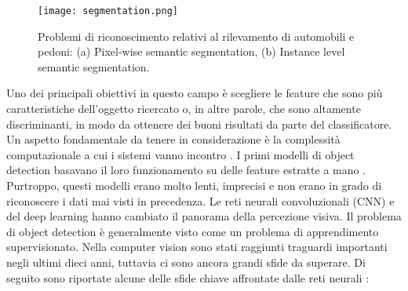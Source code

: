 \begin{figure}
    \centering
    \texttt{[image: segmentation.png]}
    \centering
    \caption{Problemi di riconoscimento relativi al rilevamento di automobili e pedoni: (a) Pixel-wise semantic segmentation, (b) Instance level semantic segmentation.}
    \label{segmentation}
\end{figure}
Uno dei principali obiettivi in questo campo è scegliere le feature che 
sono più caratteristiche dell'oggetto ricercato o, in altre parole, che sono 
altamente discriminanti, in modo da ottenere dei buoni risultati da parte 
del classificatore. Un aspetto fondamentale da tenere in considerazione è 
la complessità computazionale a cui i sistemi vanno incontro \cite{cyganek2013object}. I primi 
modelli di object detection basavano il loro funzionamento su delle feature 
estratte a mano \cite{viola2001rapid} \cite{dalal2005histograms}. Purtroppo, questi modelli erano molto lenti, 
imprecisi e non erano in grado di riconoscere i dati mai visti in precedenza. 
Le reti neurali convoluzionali (CNN) e del deep learning hanno cambiato 
il panorama della percezione visiva. Il problema di object detection è 
generalmente visto come un problema di apprendimento supervisionato. 
Nella computer vision sono stati raggiunti traguardi importanti negli ultimi 
dieci anni, tuttavia ci sono ancora grandi sfide da superare. Di seguito sono 
riportate alcune delle sfide chiave affrontate dalle reti neurali \cite{zaidi2021survey}:
